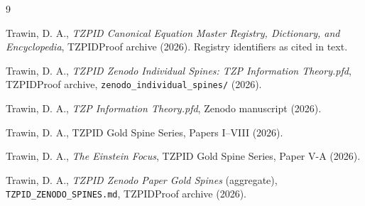 \documentclass[11pt]{article}
\theoremstyle{remark}
\begin{document}
\begin{thebibliography}{9}

 Trawin, D. A., \emph{TZPID Canonical Equation Master Registry, Dictionary, and Encyclopedia}, TZPIDProof archive (2026). Registry identifiers as cited in text.

 Trawin, D. A., \emph{TZPID Zenodo Individual Spines: TZP Information Theory.pfd}, TZPIDProof archive, \texttt{zenodo\_individual\_spines/} (2026).

 Trawin, D. A., \emph{TZP Information Theory.pfd}, Zenodo manuscript (2026).

 Trawin, D. A., TZPID Gold Spine Series, Papers I--VIII (2026).

 Trawin, D. A., \emph{The Einstein Focus}, TZPID Gold Spine Series, Paper V-A (2026).

 Trawin, D. A., \emph{TZPID Zenodo Paper Gold Spines} (aggregate), \texttt{TZPID\_ZENODO\_SPINES.md}, TZPIDProof archive (2026).

\end{thebibliography}
\end{document}
